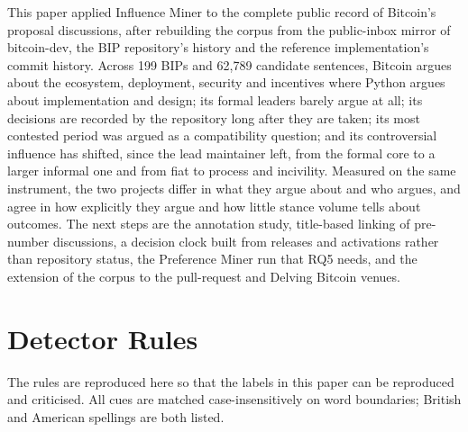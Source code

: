 \documentclass[sigconf,screen]{acmart}
\begin{document}
This paper applied Influence Miner to the complete public record of Bitcoin's proposal discussions, after rebuilding the corpus from the public-inbox mirror of bitcoin-dev, the BIP repository's history and the reference implementation's commit history. Across 199 BIPs and 62,789 candidate sentences, Bitcoin argues about the ecosystem, deployment, security and incentives where Python argues about implementation and design; its formal leaders barely argue at all; its decisions are recorded by the repository long after they are taken; its most contested period was argued as a compatibility question; and its controversial influence has shifted, since the lead maintainer left, from the formal core to a larger informal one and from fiat to process and incivility. Measured on the same instrument, the two projects differ in what they argue about and who argues, and agree in how explicitly they argue and how little stance volume tells about outcomes. The next steps are the annotation study, title-based linking of pre-number discussions, a decision clock built from releases and activations rather than repository status, the Preference Miner run that RQ5 needs, and the extension of the corpus to the pull-request and Delving Bitcoin venues.

\appendix

\section{Detector Rules}
\label{app:rules}

The rules are reproduced here so that the labels in this paper can be reproduced and criticised. All cues are matched case-insensitively on word boundaries; British and American spellings are both listed.
\end{document}
